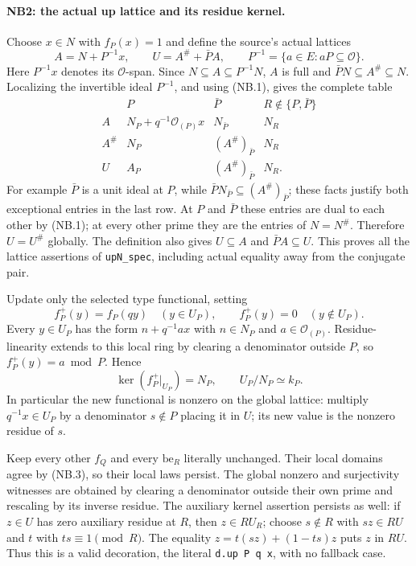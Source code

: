 \documentclass[11pt,a4paper]{article}
\numberwithin{equation}{section}
\theoremstyle{remark}\newtheorem{remark}[theorem]{Remark}
\begin{document}
\paragraph{NB2: the actual up lattice and its residue kernel.}
Choose $x\in N$ with $f_P(x)=1$ and define the source's actual lattices
\[
 A=N+P^{-1}x,\qquad U=A^\#+\bar P A,
 \qquad P^{-1}=\{a\in E:aP\subseteq\mathcal O\}.
 \tag{NB.2}
\]
Here $P^{-1}x$ denotes its $\mathcal O$-span. Since
$N\subseteq A\subseteq P^{-1}N$, $A$ is full and
$\bar P N\subseteq A^\#\subseteq N$. Localizing the invertible ideal
$P^{-1}$, and using (NB.1), gives the complete table
\[
\begin{array}{c|ccc}
 &P&\bar P&R\notin\{P,\bar P\}\\ \hline
 A&N_P+q^{-1}\mathcal O_{(P)}x&N_{\bar P}&N_R\\
 A^\#&N_P&(A^\#)_{\bar P}&N_R\\
 U&A_P&(A^\#)_{\bar P}&N_R.
\end{array}                                                    \tag{NB.3}
\]
For example $\bar P$ is a unit ideal at $P$, while
$\bar P N_{\bar P}\subseteq(A^\#)_{\bar P}$; these facts justify
both exceptional entries in the last row. At $P$ and $\bar P$ these
entries are dual to each other by (NB.1); at every other prime they are
the entries of $N=N^\#$. Therefore $U=U^\#$ globally. The definition
also gives $U\subseteq A$ and $\bar P A\subseteq U$. This proves all
the lattice assertions of \texttt{upN\_\allowbreak spec}, including actual equality
away from the conjugate pair.

Update only the selected type functional, setting
\[
 f_P^+(y)=f_P(qy)\quad(y\in U_P),\qquad
 f_P^+(y)=0\quad(y\notin U_P).                       \tag{NB.4}
\]
Every $y\in U_P$ has the form $n+q^{-1}a x$ with
$n\in N_P$ and $a\in\mathcal O_{(P)}$. Residue-linearity extends to
this local ring by clearing a denominator outside $P$, so
$f_P^+(y)=a\bmod P$. Hence
\[
 \ker(f_P^+|_{U_P})=N_P,\qquad U_P/N_P\simeq k_P.     \tag{NB.5}
\]
In particular the new functional is nonzero on the global lattice:
multiply $q^{-1}x\in U_P$ by a denominator $s\notin P$ placing it in
$U$; its new value is the nonzero residue of $s$.

Keep every other $f_Q$ and every $\mathrm{be}_R$ literally unchanged.
Their local domains agree by (NB.3), so their local laws persist.
The global nonzero and surjectivity witnesses are obtained by clearing
a denominator outside their own prime and rescaling by its inverse
residue. The auxiliary kernel assertion persists as well: if
$z\in U$ has zero auxiliary residue at $R$, then $z\in R U_R$;
choose $s\notin R$ with $sz\in R U$ and $t$ with
$ts\equiv1\pmod R$. The equality
$z=t(sz)+(1-ts)z$ puts $z$ in $RU$. Thus this is a valid decoration,
the literal \texttt{d.up P q x}, with no fallback case.
\end{document}
